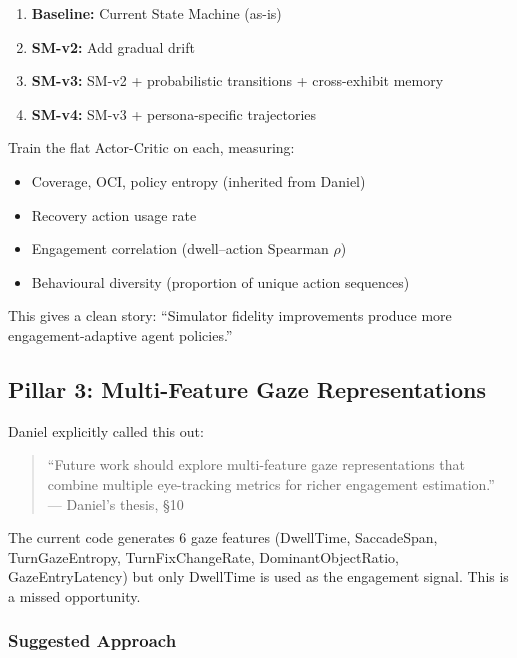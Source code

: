 \documentclass[11pt,a4paper]{article}
\begin{document}
\begin{enumerate}
    \item \textbf{Baseline:} Current State Machine (as-is)
    \item \textbf{SM-v2:} Add gradual drift
    \item \textbf{SM-v3:} SM-v2 + probabilistic transitions + cross-exhibit memory
    \item \textbf{SM-v4:} SM-v3 + persona-specific trajectories
\end{enumerate}

Train the flat Actor-Critic on each, measuring:

\begin{itemize}
    \item Coverage, OCI, policy entropy (inherited from Daniel)
    \item Recovery action usage rate
    \item Engagement correlation (dwell--action Spearman $\rho$)
    \item Behavioural diversity (proportion of unique action sequences)
\end{itemize}

This gives a clean story: ``Simulator fidelity improvements produce more engagement-adaptive agent policies.''


\subsection{Pillar 3: Multi-Feature Gaze Representations}

Daniel explicitly called this out:

\begin{quote}
``Future work should explore multi-feature gaze representations that combine multiple eye-tracking metrics for richer engagement estimation.''\\
--- Daniel's thesis, \S10
\end{quote}

The current code generates 6 gaze features (DwellTime, SaccadeSpan, TurnGazeEntropy, TurnFixChangeRate, DominantObjectRatio, GazeEntryLatency) but only DwellTime is used as the engagement signal. This is a missed opportunity.

\subsubsection{Suggested Approach}
\end{document}
